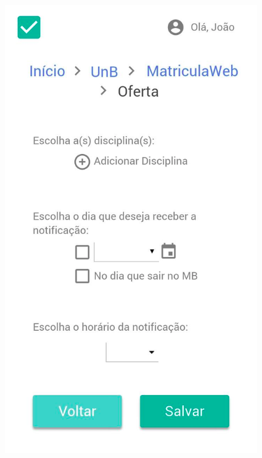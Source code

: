 \begin{figure}[h!]
{      \includegraphics[keepaspectratio=true, scale=0.2]{figuras/mob14.png}
   }
    
\end{figure}

